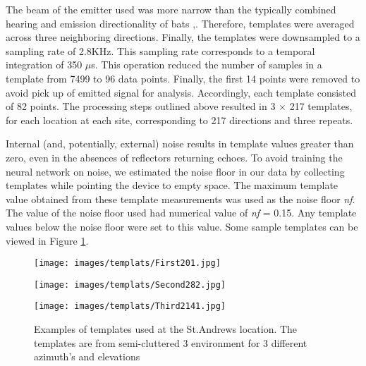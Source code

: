 \documentclass[11pt]{report}
\begin{document}
The beam of the emitter used was more narrow than the typically combined hearing and emission directionality of bats \cite{reijniers2010morphology},\cite{jakobsen2013intensity}. Therefore, templates were averaged across three neighboring directions. Finally, the templates were downsampled to a sampling rate of 2.8KHz. This sampling rate corresponds to a temporal integration of 350 $\mu$s. This operation reduced the number of samples in a template from 7499 to 96 data points. Finally, the first 14 points were removed to avoid pick up of emitted signal for analysis. Accordingly, each template consisted of 82 points. The processing steps outlined above resulted in 3 $\times$ 217 templates, for each location at each site, corresponding to 217 directions and three repeats.

Internal (and, potentially, external) noise results in template values greater than zero, even in the absences of reflectors returning echoes. To avoid training the neural network on noise, we estimated the noise floor in our data by collecting templates while pointing the device to empty space. The maximum template value obtained from these template measurements was used as the noise floor \textit{nf}. The value of the noise floor used had numerical value of \textit{nf} = 0.15. Any template values below the noise floor were set to this value. Some sample templates can be viewed in Figure \ref{templates}.

\begin{figure}[ht]
    \centering
    \begin{minipage}{0.45\textwidth}
        \centering
        \texttt{[image: images/templats/First201.jpg]} %
    \end{minipage}\hfill
    \begin{minipage}{0.45\textwidth}
        \centering
        \texttt{[image: images/templats/Second282.jpg]} %
    \end{minipage}
    \begin{minipage}{0.45\textwidth}
        \centering
        \texttt{[image: images/templats/Third2141.jpg]} %
    \end{minipage}
    \caption{Examples of templates used at the St.Andrews location. The templates are from semi-cluttered 3 environment for 3 different azimuth's and elevations}
    \label{templates}
\end{figure}
\end{document}
